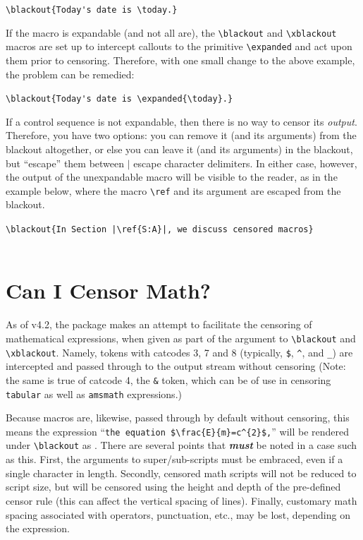 \documentclass{article}
\begin{document}
\verb|\blackout{Today's date is \today.}|\\

If the macro is expandable (and not all are), the \verb|\blackout| 
  and \verb|\xblackout| macros are set up to intercept callouts to
  the primitive \verb|\expanded| and act upon them prior to censoring.
Therefore, with one small change to the above example, the problem
  can be remedied:

\verb|\blackout{Today's date is \expanded{\today}.}|\\

If a control sequence is not expandable, then there is no way to
  censor its \textit{output}.
Therefore, you have two options: you can remove it (and its arguments)
  from the blackout altogether, or else you can leave it (and its arguments)
  in the blackout, but ``escape'' them between $|$ escape character
  delimiters.
In either case, however, the output of the unexpandable macro will be 
  visible to the reader, as in the example below, where the macro 
  \verb|\ref| and its argument are escaped from the blackout.

\verb+\blackout{In Section |\ref{S:A}|, we discuss censored macros}+\\
\StopCensoring
{}\\
\RestartCensoring
{}

\section{Can I Censor Math?}

As of v4.2, the package makes an attempt to facilitate the
  censoring of mathematical expressions, when given as part of the
  argument to \verb|\blackout| and \verb|\xblackout|.  
Namely, tokens with catcodes 3, 7 and 8 (typically, 
  \verb|$|, \verb|^|, and \verb|_|) are intercepted and passed
  through to the output stream without censoring
(Note: the same is true of catcode 4, the \verb|&| token, which can 
  be of use in censoring \verb|tabular| as well as 
  \verb|amsmath| expressions.)

Because macros are, likewise, passed through by default without
  censoring, this means the expression 
  ``\verb|the equation $\frac{E}{m}=c^{2}$,|'' will be rendered under 
  \verb|\blackout| as .
There are several points that \textbf{\textit{must}} be noted in
  a case such as this.  First, the arguments to super/sub-scripts 
  must be embraced, even if a single character in length.
Secondly, censored math scripts will not be reduced to script size, but
  will be censored using the height and depth of the pre-defined
  censor rule (this can
  affect the vertical spacing of lines).
Finally, customary math spacing associated with operators, 
  punctuation, etc., may be lost, depending on the expression. 
\end{document}
